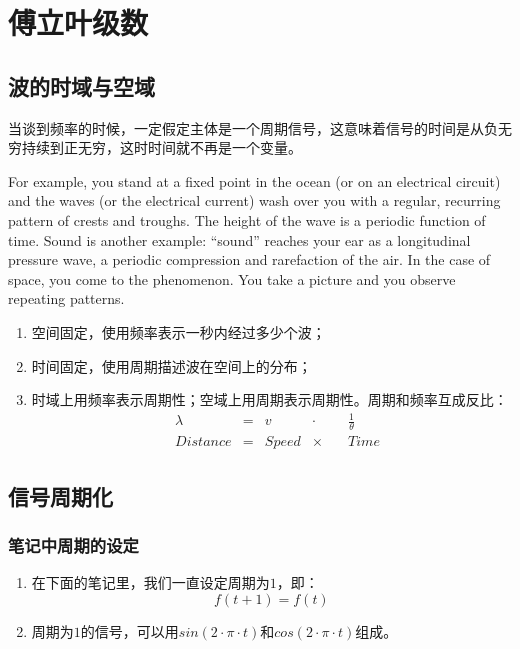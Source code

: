 \chapter{傅立叶级数}
\section{波的时域与空域}
当谈到频率的时候，一定假定主体是一个周期信号，这意味着信号的时间是从负无穷持续到正无穷，这时时间就不再是一个变量。

For example, you stand at a ﬁxed point in the ocean (or on an electrical circuit) and the waves (or the electrical current) wash over you with a regular, recurring pattern of crests and troughs. The height of the wave is a periodic function of time. Sound is another example: “sound” reaches your ear as a longitudinal pressure wave, a periodic compression and rarefaction of the air. In the case of space, you come to the phenomenon. You take a picture and you observe repeating patterns.
\begin{enumerate}
	\item 空间固定，使用频率表示一秒内经过多少个波；
	\item 时间固定，使用周期描述波在空间上的分布；
	\item 时域上用频率表示周期性；空域上用周期表示周期性。周期和频率互成反比：
	      \begin{align*}
		       & \lambda  & = & v     & \cdot   \quad & \frac{1}{\theta} \\
		       & Distance & = & Speed & \times  \quad & Time
	      \end{align*}
\end{enumerate}

\section{信号周期化}
\subsection{笔记中周期的设定}
\begin{enumerate}
	\item 在下面的笔记里，我们一直设定周期为$1$，即：
	      \begin{equation}
		      f(t+1)=f(t)
	      \end{equation}
	\item 周期为$1$的信号，可以用$sin(2\cdot \pi \cdot t)$和$cos(2\cdot \pi \cdot t)$组成。

\end{enumerate}
